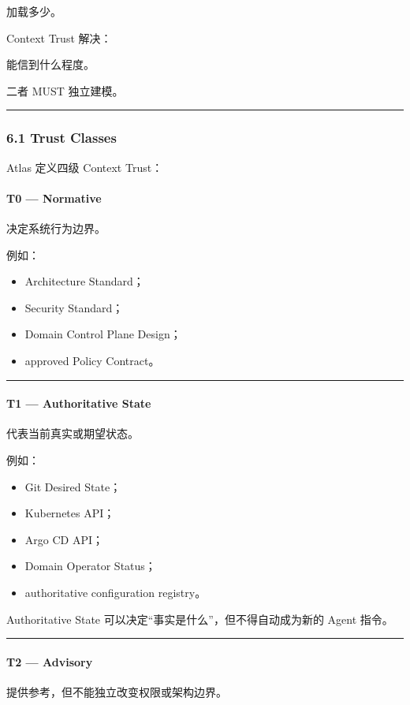 \documentclass[11pt,a4paper]{article}
\begin{document}
\begin{gfmBlockquote}
加载多少。
\end{gfmBlockquote}
Context Trust 解决：

\begin{gfmBlockquote}
能信到什么程度。
\end{gfmBlockquote}
二者 MUST 独立建模。

\vspace{0.5em}\hrule\vspace{0.5em}
\subsubsection{6.1 Trust Classes}
Atlas 定义四级 Context Trust：

\paragraph{T0 — Normative}
决定系统行为边界。

例如：

\begin{itemize}
  \item Architecture Standard；
  \item Security Standard；
  \item Domain Control Plane Design；
  \item approved Policy Contract。
\end{itemize}
\vspace{0.5em}\hrule\vspace{0.5em}
\paragraph{T1 — Authoritative State}
代表当前真实或期望状态。

例如：

\begin{itemize}
  \item Git Desired State；
  \item Kubernetes API；
  \item Argo CD API；
  \item Domain Operator Status；
  \item authoritative configuration registry。
\end{itemize}
Authoritative State 可以决定“事实是什么”，但不得自动成为新的 Agent 指令。

\vspace{0.5em}\hrule\vspace{0.5em}
\paragraph{T2 — Advisory}
提供参考，但不能独立改变权限或架构边界。
\end{document}
